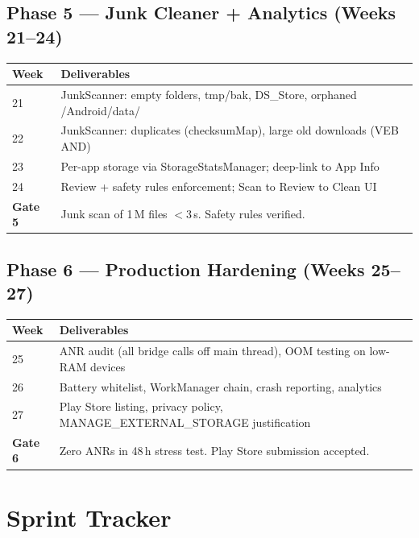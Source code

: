 \section{Phase 5 --- Junk Cleaner + Analytics (Weeks 21--24)}

\begin{longtable}{@{}p{14mm}p{126mm}@{}}
\toprule
\textbf{Week} & \textbf{Deliverables} \\
\midrule
21 & JunkScanner: empty folders, tmp/bak, DS\_Store, orphaned /Android/data/ \\
22 & JunkScanner: duplicates (checksumMap), large old downloads (VEB AND) \\
23 & Per-app storage via StorageStatsManager; deep-link to App Info \\
24 & Review + safety rules enforcement; Scan to Review to Clean UI \\
\midrule
\textbf{Gate 5} & Junk scan of 1\,M files $<$3\,s. Safety rules verified. \\
\bottomrule
\end{longtable}

\section{Phase 6 --- Production Hardening (Weeks 25--27)}

\begin{longtable}{@{}p{14mm}p{126mm}@{}}
\toprule
\textbf{Week} & \textbf{Deliverables} \\
\midrule
25 & ANR audit (all bridge calls off main thread), OOM testing on low-RAM devices \\
26 & Battery whitelist, WorkManager chain, crash reporting, analytics \\
27 & Play Store listing, privacy policy, MANAGE\_EXTERNAL\_STORAGE justification \\
\midrule
\textbf{Gate 6} & Zero ANRs in 48\,h stress test. Play Store submission accepted. \\
\bottomrule
\end{longtable}

\chapter{Sprint Tracker}

